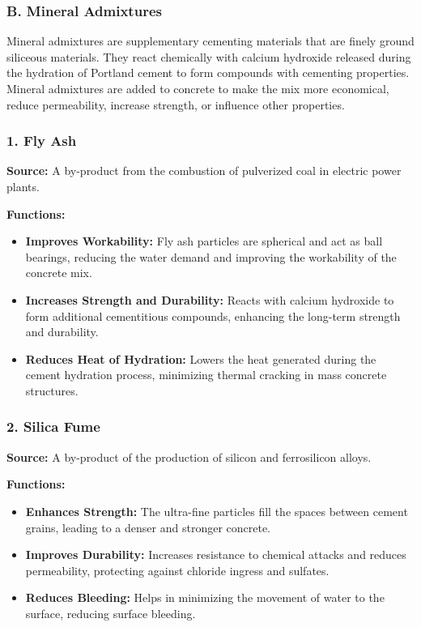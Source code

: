 \documentclass[a4paper,11pt]{book}
\begin{document}
\subsubsection*{B. Mineral Admixtures}

Mineral admixtures are supplementary cementing materials that are finely ground siliceous materials. They react chemically with calcium hydroxide released during the hydration of Portland cement to form compounds with cementing properties. Mineral admixtures are added to concrete to make the mix more economical, reduce permeability, increase strength, or influence other properties.

\subsubsection*{1. Fly Ash}
\textbf{Source:} A by-product from the combustion of pulverized coal in electric power plants.

\textbf{Functions:}
\begin{itemize}
    \item \textbf{Improves Workability:} Fly ash particles are spherical and act as ball bearings, reducing the water demand and improving the workability of the concrete mix.
    \item \textbf{Increases Strength and Durability:} Reacts with calcium hydroxide to form additional cementitious compounds, enhancing the long-term strength and durability.
    \item \textbf{Reduces Heat of Hydration:} Lowers the heat generated during the cement hydration process, minimizing thermal cracking in mass concrete structures.
\end{itemize}

\subsubsection*{2. Silica Fume}
\textbf{Source:} A by-product of the production of silicon and ferrosilicon alloys.

\textbf{Functions:}
\begin{itemize}
    \item \textbf{Enhances Strength:} The ultra-fine particles fill the spaces between cement grains, leading to a denser and stronger concrete.
    \item \textbf{Improves Durability:} Increases resistance to chemical attacks and reduces permeability, protecting against chloride ingress and sulfates.
    \item \textbf{Reduces Bleeding:} Helps in minimizing the movement of water to the surface, reducing surface bleeding.
\end{itemize}
\end{document}
